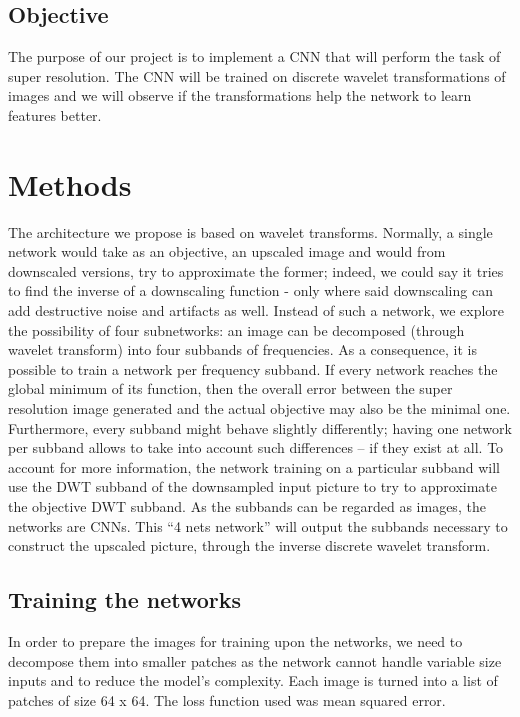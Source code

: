 \documentclass[letterpaper,twocolumn,fleqn]{article}
\begin{document}
\subsection{Objective}

The purpose of our project is to implement a CNN that will perform the task of super resolution. The
CNN will be trained on discrete wavelet transformations of images and we will observe if the
transformations help the network to learn features better. 



\section{Methods}

The architecture we propose is based on wavelet transforms. Normally, a single network would take as
an objective, an upscaled image and would from downscaled versions, try to approximate the former;
indeed, we could say it tries to find the inverse of a downscaling function - only where said downscaling
can add destructive noise and artifacts as well.
Instead of such a network, we explore the possibility of four subnetworks: an image can be decomposed
(through wavelet transform) into four subbands of frequencies. As a consequence, it is possible to train
a network per frequency subband. If every network reaches the global minimum of its function, then the
overall error between the super resolution image generated and the actual objective may also be the
minimal one. Furthermore, every subband might behave slightly differently; having one network per
subband allows to take into account such differences -- if they exist at all.
To account for more information, the network training on a particular subband will use the DWT
subband of the downsampled input picture to try to approximate the objective DWT subband. As the
subbands can be regarded as images, the networks are CNNs.
This “4 nets network” will output the subbands necessary to construct the upscaled picture, through the
inverse discrete wavelet transform. 

\subsection{Training the networks}

In order to prepare the images for training upon the networks, we need to decompose them into smaller patches 
as the network cannot handle variable size inputs and to reduce the model's complexity. Each image is turned into a 
list of patches of size 64 x 64. The loss function used was mean squared error.
\end{document}
